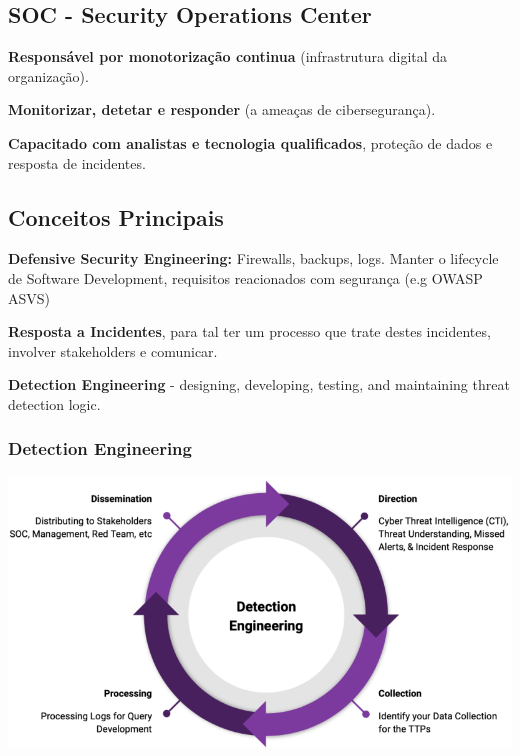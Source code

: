 \documentclass{article}
\begin{document}
\subsection{SOC - Security Operations Center}

\begin{flushleft}
  \textbf{Responsável por monotorização continua} (infrastrutura digital da
  organização).

  \vspace{2mm}

  \textbf{Monitorizar, detetar e responder} (a ameaças de cibersegurança).

  \vspace{2mm}

  \textbf{Capacitado com analistas e tecnologia qualificados}, proteção de dados
  e resposta de incidentes.
\end{flushleft}

\subsection{Conceitos Principais}

\begin{flushleft}
  \textbf{Defensive Security Engineering:} Firewalls, backups, logs. Manter o
  lifecycle de Software Development, requisitos reacionados com segurança
  (e.g OWASP ASVS)

  \vspace{2mm}

  \textbf{Resposta a Incidentes}, para tal ter um processo que trate destes
  incidentes, involver stakeholders e comunicar.

  \vspace{2mm}

  \textbf{Detection Engineering} - designing, developing, testing,
  and maintaining threat detection logic.
\end{flushleft}

\subsubsection{Detection Engineering}

\begin{center}
  \includegraphics[scale=0.4]{43}
\end{center}
\end{document}
